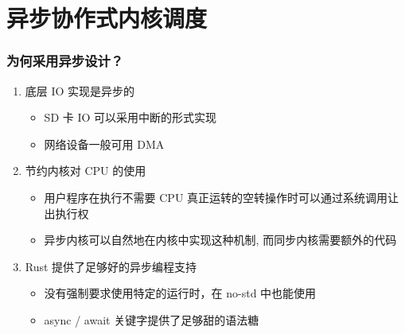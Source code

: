 \section{异步协作式内核调度}

\begin{frame}
    \frametitle{为何采用异步设计？}

    \begin{enumerate}
        \item 底层 IO 实现是异步的
              \begin{itemize}
                  \item SD 卡 IO 可以采用中断的形式实现
                  \item 网络设备一般可用 DMA
              \end{itemize}
        \item 节约内核对 CPU 的使用
              \begin{itemize}
                  \item 用户程序在执行不需要 CPU 真正运转的空转操作时可以通过系统调用让出执行权
                  \item 异步内核可以自然地在内核中实现这种机制, 而同步内核需要额外的代码
              \end{itemize}
        \item Rust 提供了足够好的异步编程支持
              \begin{itemize}
                  \item 没有强制要求使用特定的运行时，在 no-std 中也能使用
                  \item async / await 关键字提供了足够甜的语法糖
              \end{itemize}
    \end{enumerate}
\end{frame}

